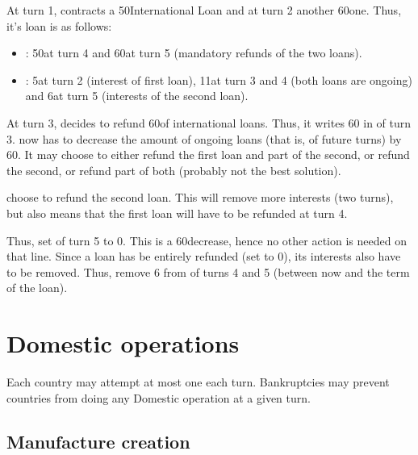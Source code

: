 \begin{exemple}
  At turn 1, \POL contracts a 50\ducats International Loan and at turn 2
  another 60\ducats one. Thus, it's loan \EcoRS is as follows:\\
  \begin{itemize}
  \item {}: 50\ducats at turn 4 and
    60\ducats at turn 5 (mandatory refunds of the two loans).
  \item {}: 5\ducats at turn 2
    (interest of first loan), 11\ducats at turn 3 and 4 (both loans are
    ongoing) and 6\ducats at turn 5 (interests of the second loan).
  \end{itemize}
  At turn 3, \POL decides to refund 60\ducats of international loans. Thus, it
  writes 60 in  of turn 3. \POL now
  has to decrease the amount of ongoing loans (that is,
   of future turns) by 60. It may
  choose to either refund the first loan and part of the second, or refund the
  second, or refund part of both (probably not the best solution).

  \POL choose to refund the second loan. This will remove more interests (two
  turns), but also means that the first loan will have to be refunded at turn
  4.
  
  Thus, \POL set  of turn 5 to
  0. This is a 60\ducats decrease, hence no other action is needed on that
  line. Since a loan has be entirely refunded (set to 0), its interests also
  have to be removed. Thus, \POL remove 6 from  of turns 4 and 5 (between now and the term of the loan).
\end{exemple}

\section{Domestic operations}\label{chExpenses:Domestic}

\aparag Each country may attempt at most one  each
turn.
\bparag Bankruptcies may prevent countries from doing any Domestic operation
at a given turn.



\subsection{Manufacture creation}

